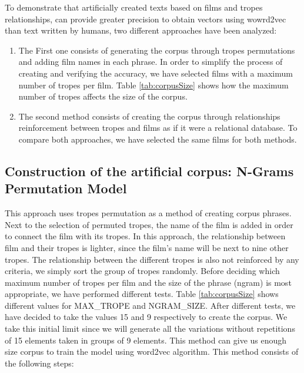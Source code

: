 \documentclass[letterpaper]{article}
\begin{document}
	
	To demonstrate that artificially created texts based on films and tropes relationships, can provide greater precision to obtain vectors using wowrd2vec than text written by humans, two different approaches have been analyzed:
	\begin{enumerate}
	\item The First one consists of generating the corpus through tropes permutations and adding film names in each phrase. In order to simplify the process of creating and verifying the accuracy, we have selected films with a maximum number of tropes per film. Table \ref{tab:corpusSize} shows how the maximum number of tropes affects the size of the corpus.
	
	\item The second method consists of creating the corpus through relationships reinforcement between tropes and films as if it were a relational database. To compare both approaches, we have selected the same films for both methods.
	\end{enumerate}
	
	\subsection{Construction of the artificial corpus: N-Grams Permutation Model}

	This approach uses tropes permutation as a method of creating corpus phrases. Next to the selection of permuted tropes, the name of the film is added in order to connect the film with its tropes. In this approach, the relationship between film and their tropes is lighter, since the film's name will be next to nine other tropes. The relationship between the different tropes is also not reinforced by any criteria, we simply sort the group of tropes randomly. Before deciding which maximum number of tropes per film and the size of the phrase (ngram) is most appropriate, we have performed different tests. Table \ref{tab:corpusSize} shows different values for MAX\_TROPE and NGRAM\_SIZE. After different tests, we have decided to take the values 15 and 9 respectively to create the corpus. We take this
	initial limit since we will generate all the variations
	without repetitions of 15 elements taken in groups of 9
	elements. This method can give us enough size corpus to train the model using word2vec algorithm. This method consists of the following steps:
	
\end{document}
